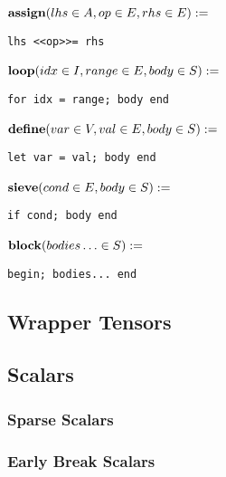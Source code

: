 \noindent\begin{minipage}{\leftwidth}
\raggedleft $\text{\textbf{assign}}(lhs \in A, op \in E, rhs \in E) :=$~
\end{minipage}%
\begin{minipage}{\rightwidth}
\begin{verbatim}
lhs <<op>>= rhs
\end{verbatim}
\end{minipage}

\noindent\begin{minipage}{\leftwidth}
\raggedleft $\text{\textbf{loop}}(idx \in I, range \in E, body \in S) :=$~
\end{minipage}%
\begin{minipage}{\rightwidth}
\begin{verbatim}
for idx = range; body end
\end{verbatim}
\end{minipage}

\noindent\begin{minipage}{\leftwidth}
\raggedleft $\text{\textbf{define}}(var \in V, val \in E, body \in S) :=$~
\end{minipage}%
\begin{minipage}{\rightwidth}
\begin{verbatim}
let var = val; body end
\end{verbatim}
\end{minipage}

\noindent\begin{minipage}{\leftwidth}
\raggedleft $\text{\textbf{sieve}}(cond \in E, body \in S) :=$~
\end{minipage}%
\begin{minipage}{\rightwidth}
\begin{verbatim}
if cond; body end
\end{verbatim}
\end{minipage}

\noindent\begin{minipage}{\leftwidth}
\raggedleft $\text{\textbf{block}}(bodies\ldots \in S) :=$~
\end{minipage}%
\begin{minipage}{\rightwidth}
\begin{verbatim}
begin; bodies... end
\end{verbatim}
\end{minipage}

\subsection{Wrapper Tensors}

\subsection{Scalars}

\subsubsection{Sparse Scalars}
\subsubsection{Early Break Scalars}

